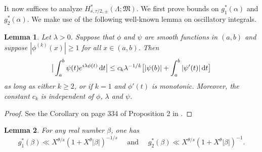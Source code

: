 \documentclass[11pt,reqno]{amsart}
\numberwithin{equation}{section}
\newtheorem{lemma}{Lemma}[section]
\renewcommand{\d}{\,{\rm d}}
\begin{document}
It now suffices to analyze $H^*_{s,\tau/2,\pm}(\Lambda;\mathfrak{M})$. We first prove bounds on $g_1^*(\alpha)$ and $g_2^*(\alpha)$. 
We make use of the following well-known lemma on oscillatory integrals. 

\begin{lemma} \label{lem:stein}
Let $\lambda > 0$. Suppose that $\phi$ and $\psi$ are smooth functions in $(a,b)$ and suppose $|\phi^{(k)}(x)| \geq 1$ for all $x \in (a,b)$. Then 
\[ \big|\int_a^b \psi(t)e^{i\lambda \phi(t)} \d t \big| \leq c_k\lambda^{-1/k}\big[ |\psi(b)|+\int_a^b |\psi'(t)|\d t \big] \]
as long as either $k \geq 2$, or if $k = 1$ and $\phi'(t)$ is monotonic. Moreover, the constant $c_k$ is independent of $\phi$, $\lambda$ and $\psi$. 
\end{lemma}

\begin{proof} See the Corollary on page 334 of Proposition 2 in \cite{Stein}. 
\end{proof}


\begin{lemma} \label{lem:approxbound}
For any real number $\beta$, one has 
\[ g_1^*(\beta) \ll X^{\theta/s}(1+X^{\theta}|\beta|)^{-1/s} \quad \text{ and } \quad g_2^*(\beta) \ll X^{\theta/s}(1+X^{\theta}|\beta|)^{-1}. \]
\end{lemma}
\end{document}
